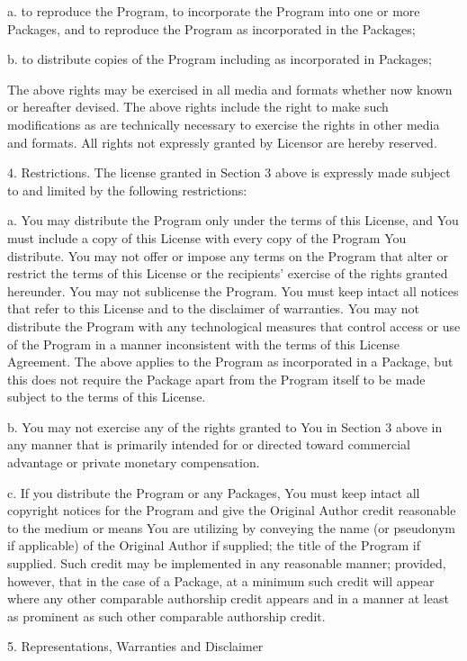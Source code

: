 a.    to reproduce the Program, to incorporate the Program into one or more
Packages, and to reproduce the Program as incorporated in the Packages;

b.    to distribute copies of the Program including as incorporated in Packages;

The above rights may be exercised in all media and formats whether now known or
hereafter devised. The above rights include the right to make such modifications
as are technically necessary to exercise the rights in other media and formats.
All rights not expressly granted by Licensor are hereby reserved.

4. Restrictions. The license granted in Section 3 above is expressly made
subject to and limited by the following restrictions:

a.    You may distribute the Program only under the terms of this License, and
You must include a copy of this License with every copy of the Program You
distribute. You may not offer or impose any terms on the Program that alter or
restrict the terms of this License or the recipients' exercise of the rights
granted hereunder. You may not sublicense the Program. You must keep intact all
notices that refer to this License and to the disclaimer of warranties. You may
not distribute the Program with any technological measures that control access
or use of the Program in a manner inconsistent with the terms of this License
Agreement. The above applies to the Program as incorporated in a Package, but
this does not require the Package apart from the Program itself to be made
subject to the terms of this License.

b.    You may not exercise any of the rights granted to You in Section 3 above
in any manner that is primarily intended for or directed toward commercial
advantage or private monetary compensation.

c.    If you distribute the Program or any Packages, You must keep intact all
copyright notices for the Program and give the Original Author credit reasonable
to the medium or means You are utilizing by conveying the name (or pseudonym if
applicable) of the Original Author if supplied; the title of the Program if
supplied. Such credit may be implemented in any reasonable manner; provided,
however, that in the case of a Package, at a minimum such credit will appear
where any other comparable authorship credit appears and in a manner at least
as prominent as such other comparable authorship credit.

5. Representations, Warranties and Disclaimer

